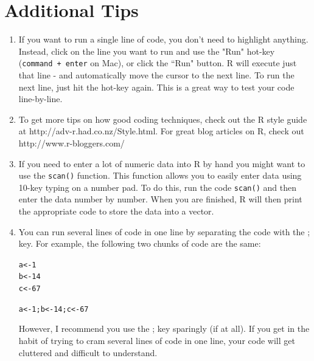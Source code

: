 \documentclass{tufte-book}\usepackage[]{graphicx}\usepackage[]{color}
\makeatletter
\newcommand{\hlnum}[1]{\textcolor[rgb]{0.686,0.059,0.569}{#1}}%
\newcommand{\hlstd}[1]{\textcolor[rgb]{0.345,0.345,0.345}{#1}}%
\newcommand{\hlkwb}[1]{\textcolor[rgb]{0.69,0.353,0.396}{#1}}%
\newenvironment{kframe}{%
 \def\at@end@of@kframe{}%
 \ifinner\ifhmode%
  \def\at@end@of@kframe{\end{minipage}}%
  \begin{minipage}{\columnwidth}%
 \fi\fi%
 \def\FrameCommand##1{\hskip\@totalleftmargin \hskip-\fboxsep
 \colorbox{shadecolor}{##1}\hskip-\fboxsep
     \hskip-\linewidth \hskip-\@totalleftmargin \hskip\columnwidth}%
 \MakeFramed {\advance\hsize-\width
   \@totalleftmargin\z@ \linewidth\hsize
   \@setminipage}}%
 {\par\unskip\endMakeFramed%
 \at@end@of@kframe}
\newenvironment{knitrout}{}{} %
\makeatother
\begin{document}
\section{Additional Tips}


\begin{enumerate}

  \item If you want to run a single line of code, you don't need to highlight anything. Instead, click on the line you want to run and use the "Run" hot-key (\texttt{command + enter} on Mac), or click the ``Run" button. R will execute just that line - and automatically move the cursor to the next line. To run the next line, just hit the hot-key again. This is a great way to test your code line-by-line.

  \item To get more tips on how good coding techniques, check out the R style guide at http://adv-r.had.co.nz/Style.html. For great blog articles on R, check out http://www.r-bloggers.com/

  \item If you need to enter a lot of numeric data into R by hand you might want to use the \texttt{scan()} function. This function allows you to easily enter data using 10-key typing on a number pad. To do this, run the code \texttt{scan()} and then enter the data number by number. When you are finished, R will then print the appropriate code to store the data into a vector.

  \item You can run several lines of code in one line by separating the code with the ; key. For example, the following two chunks of code are the same:

\begin{knitrout}
\color{fgcolor}\begin{kframe}
\begin{alltt}
\hlstd{a} \hlkwb{<-} \hlnum{1}
\hlstd{b} \hlkwb{<-} \hlnum{14}
\hlstd{c} \hlkwb{<-} \hlnum{67}
\end{alltt}
\end{kframe}
\end{knitrout}

\begin{knitrout}
\color{fgcolor}\begin{kframe}
\begin{alltt}
\hlstd{a} \hlkwb{<-} \hlnum{1} \hlstd{; b} \hlkwb{<-} \hlnum{14} \hlstd{; c} \hlkwb{<-} \hlnum{67}
\end{alltt}
\end{kframe}
\end{knitrout}


  However, I recommend you use the ; key sparingly (if at all). If you get in the habit of trying to cram several lines of code in one line, your code will get cluttered and difficult to understand.

\end{enumerate}
\end{document}
